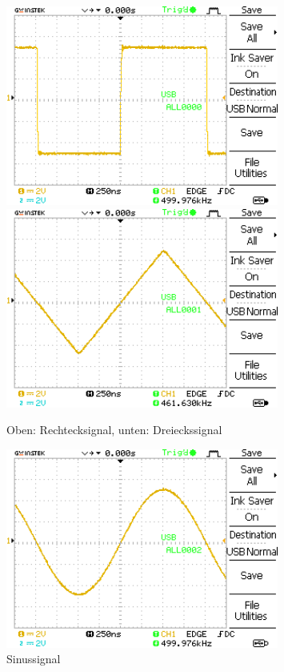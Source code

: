 \documentclass{article}
\begin{document}
				\begin{figure}[H]
					\centering
					\includegraphics[width=0.8\textwidth]{MesswerteVersuch0/A0000DS.png}
					\includegraphics[width=0.8\textwidth]{MesswerteVersuch0/A0001DS.png}
					\caption{Oben: Rechtecksignal, unten: Dreieckssignal}
					\label{fig:A0000DS,1}
				\end{figure}
				\begin{figure}[H]
					\centering
					\includegraphics[width=0.8\textwidth]{MesswerteVersuch0/A0002DS.png}
					\caption{Sinussignal}
					\label{fig:A0002DS}
				\end{figure}
	
\end{document}
